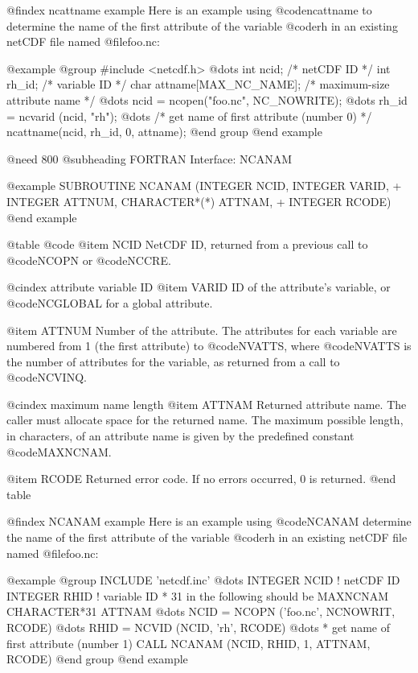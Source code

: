 {@findex ncattname example
Here is an example using @code{ncattname} to determine the name of the
first attribute of the variable @code{rh} in an existing netCDF file
named @file{foo.nc}:

@example
@group
#include <netcdf.h>
   @dots{}
int  ncid;        /* netCDF ID */
int  rh_id;       /* variable ID */
char attname[MAX_NC_NAME];  /* maximum-size attribute name */
   @dots{}
ncid = ncopen("foo.nc", NC_NOWRITE);
   @dots{}
rh_id = ncvarid (ncid, "rh");
   @dots{}
/* get name of first attribute (number 0) */
ncattname(ncid, rh_id, 0, attname);
@end group
@end example

@need 800
@subheading FORTRAN Interface:  NCANAM

@example
      SUBROUTINE NCANAM (INTEGER NCID, INTEGER VARID,
     +                   INTEGER ATTNUM, CHARACTER*(*) ATTNAM,
     +                   INTEGER RCODE)
@end example

@table @code
@item NCID
NetCDF ID, returned from a previous call to @code{NCOPN} or @code{NCCRE}.

@cindex attribute variable ID
@item VARID
ID of the attribute's variable, or @code{NCGLOBAL} for a global
attribute.

@item ATTNUM
Number of the attribute.  The attributes for each variable are numbered
from 1 (the first attribute) to @code{NVATTS}, where @code{NVATTS} is
the number of attributes for the variable, as returned from a call to
@code{NCVINQ}.

@cindex maximum name length
@item ATTNAM
Returned attribute name.  The caller must allocate space for the
returned name.  The maximum possible length, in characters, of an
attribute name is given by the predefined constant @code{MAXNCNAM}.

@item RCODE
Returned error code.  If no errors occurred, 0 is returned.
@end table

@findex NCANAM example
Here is an example using @code{NCANAM} determine the name of the
first attribute of the variable @code{rh} in an existing netCDF file
named @file{foo.nc}:

@example
@group
      INCLUDE 'netcdf.inc'
         @dots{}
      INTEGER  NCID     ! netCDF ID
      INTEGER  RHID      ! variable ID
* 31 in the following should be MAXNCNAM
      CHARACTER*31 ATTNAM
         @dots{}
      NCID = NCOPN ('foo.nc', NCNOWRIT, RCODE)
         @dots{}
      RHID = NCVID (NCID, 'rh', RCODE)
         @dots{}
* get name of first attribute (number 1)
      CALL NCANAM (NCID, RHID, 1, ATTNAM, RCODE)
@end group
@end example

}

